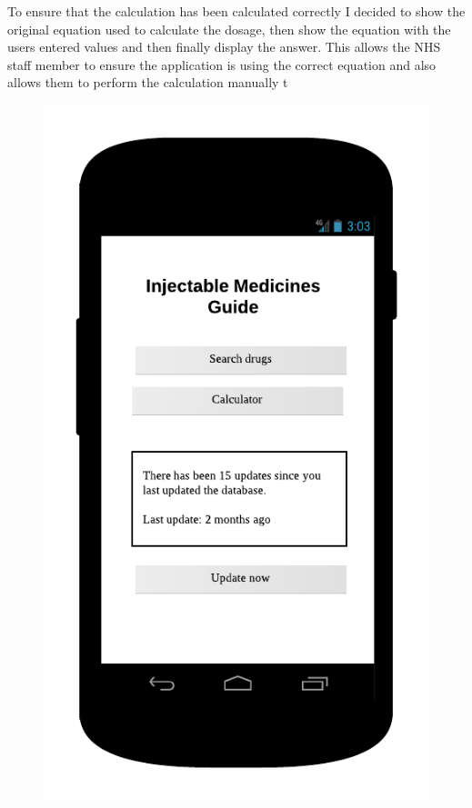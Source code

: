 To ensure that the calculation has been calculated correctly I decided to show the original equation used to calculate the dosage, then show the equation with the users entered values and then finally display the answer. This allows the NHS staff member to ensure the application is using the correct equation and also allows them to perform the calculation manually t
\begin{figure}
\centering
\begin{minipage}{.5\textwidth}
  \centering
  \includegraphics[width=.7\linewidth]{Images/mockups/main.png}
\end{minipage}
\begin{minipage}{.5\textwidth}
  \centering

\end{minipage}
\end{figure}
